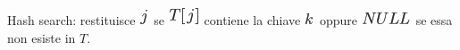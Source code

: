 \documentclass{article}
\begin{document}
{}

{}

{Hash search: restituisce }\includegraphics{images/image239.png}{~se
}\includegraphics{images/image244.png}{~contiene la chiave
}\includegraphics{images/image118.png}{~oppure
}\includegraphics{images/image240.png}{~se essa non esiste in
}$T${.}

{}

\protect\hypertarget{t.9facc68cfa90288f5906042d8bc73266aeff5bdd}{}{}\protect\hypertarget{t.36}{}{}
\end{document}
